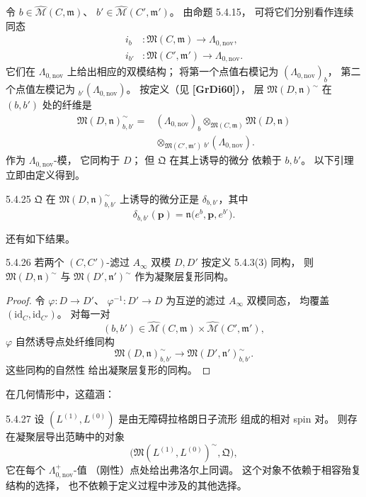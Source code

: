 令
$b\in\widehat{\mathcal M}(C,\mathfrak m)$、
$b'\in\widehat{\mathcal M}(C',\mathfrak m')$。
由命题 5.4.15，
可将它们分别看作连续同态
\[
\begin{aligned}
i_b&\colon
\mathfrak M(C,\mathfrak m)
\longrightarrow\Lambda_{0,\mathrm{nov}},\\
i_{b'}&\colon
\mathfrak M(C',\mathfrak m')
\longrightarrow\Lambda_{0,\mathrm{nov}}.
\end{aligned}
\]
它们在 $\Lambda_{0,\mathrm{nov}}$
上给出相应的双模结构；
将第一个点值右模记为
$(\Lambda_{0,\mathrm{nov}})_b$，
第二个点值左模记为
\({}_{b'}(\Lambda_{0,\mathrm{nov}})\)。
按定义（见 \textbf{[GrDi60]}），
层 $\mathfrak M(D,\mathfrak n)^{\sim}$
在 $(b,b')$ 处的纤维是
\[
\begin{aligned}
\mathfrak M(D,\mathfrak n)^{\sim}_{b,b'}
={}&
(\Lambda_{0,\mathrm{nov}})_b
\otimes_{\mathfrak M(C,\mathfrak m)}
\mathfrak M(D,\mathfrak n)\\
&{}\otimes_{\mathfrak M(C',\mathfrak m')}
{}_{b'}(\Lambda_{0,\mathrm{nov}}).
\end{aligned}
\]
作为 $\Lambda_{0,\mathrm{nov}}$-模，
它同构于 $D$；
但 $\mathfrak Q$ 在其上诱导的微分
依赖于 $b,b'$。
以下引理立即由定义得到。

\begin{lemma}{5.4.25}\label{lem:5-4-25}
$\mathfrak Q$ 在
$\mathfrak M(D,\mathfrak n)^{\sim}_{b,b'}$
上诱导的微分正是
$\delta_{b,b'}$，其中
\[
\delta_{b,b'}(\mathbf p)
=\mathfrak n
\bigl(e^b,\mathbf p,e^{b'}\bigr).
\]
\end{lemma}

还有如下结果。
\begin{lemma}{5.4.26}\label{lem:5-4-26}
若两个 $(C,C')$-滤过
$A_\infty$ 双模 $D,D'$
按定义 5.4.3(3) 同构，
则
$\mathfrak M(D,\mathfrak n)^{\sim}$
与
$\mathfrak M(D',\mathfrak n')^{\sim}$
作为凝聚层复形同构。
\end{lemma}

\begin{proof}
令
$\varphi\colon D\to D'$、
$\varphi^{-1}\colon D'\to D$
为互逆的滤过 $A_\infty$
双模同态，
均覆盖
$(\mathrm{id}_C,\mathrm{id}_{C'})$。
对每一对
\[
(b,b')\in
\widehat{\mathcal M}(C,\mathfrak m)
\times
\widehat{\mathcal M}(C',\mathfrak m'),
\]
$\varphi$ 自然诱导点处纤维同构
\[
\mathfrak M(D,\mathfrak n)^{\sim}_{b,b'}
\longrightarrow
\mathfrak M(D',\mathfrak n')^{\sim}_{b,b'}.
\]
这些同构的自然性
给出凝聚层复形的同构。
\end{proof}

在几何情形中，这蕴涵：
\begin{corollary}{5.4.27}\label{cor:5-4-27}
设 $(L^{(1)},L^{(0)})$
是由无障碍拉格朗日子流形
组成的相对 spin 对。
则存在凝聚层导出范畴中的对象
\[
\bigl(
\mathfrak M(L^{(1)},L^{(0)})^{\sim},
\mathfrak Q
\bigr),
\]
它在每个
$\Lambda^+_{0,\mathrm{nov}}$-值
（刚性）点处给出弗洛尔上同调。
这个对象不依赖于相容殆复结构的选择，
也不依赖于定义过程中涉及的其他选择。
\end{corollary}
